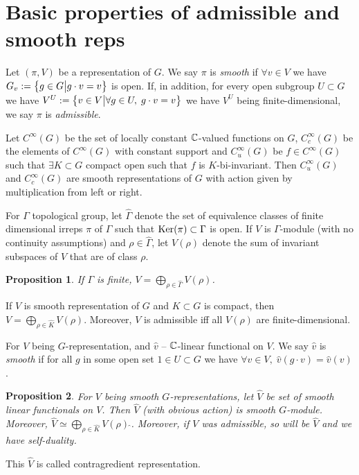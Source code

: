 \documentclass[pdf,notes]{beamer}
\theoremstyle{mystyle}
\newtheorem{prop}{Proposition}
\begin{document}
\section{Basic properties of admissible and smooth reps}
\begin{frame}
	\begin{definition}
		Let $(\pi,V)$ be a representation of $G$. We say $\pi$ is {\it smooth} if $\forall v\in V$ we have
		$G_v:=\left\{g\in G\big| g\cdot v=v\right\}$ is open. If, in addition, for every open subgroup $U\subset G$ we have $V^U:=
		\left\{v\in V\big| \forall g\in U,\;g\cdot v=v\right\}$ we have $V^U$ being finite-dimensional, we say
		$\pi$ is {\it admissible}.
	\end{definition}
	\begin{example}
		Let $C^\infty(G)$ be the set of locally constant $\mathbb{C}$-valued functions on $G$, $C^\infty_c(G)$ be the elements
		of $C^\infty(G)$ with constant support and $C^\infty_u(G)$ be $f\in C^\infty(G)$ such that $\exists K\subset G$
		compact open such that $f$ is $K$-bi-invariant. Then $C^\infty_u(G)$ and $C^\infty_c(G)$ are smooth representations
		of $G$ with action given by multiplication from left or right.
	\end{example}
\end{frame}
\begin{frame}
	For $\Gamma$ topological group, let $\hat{\Gamma}$ denote the set of equivalence classes of finite dimensional
	irreps $\pi$ of $\Gamma$
	such that $\operatorname{Ker}(\pi)\subset \Gamma$ is open. If $V$ is $\Gamma$-module (with no continuity assumptions) and
	$\rho\in\hat{\Gamma}$,
	let $V(\rho)$ denote the sum of invariant subspaces of $V$ that are of class $\rho$.
	\begin{prop}
		If $\Gamma$ is finite, $V=\bigoplus_{\rho\in\hat{\Gamma}}V(\rho)$.
		\label{<++>}
	\end{prop}
	\begin{theorem}
		If $V$ is smooth representation of $G$ and $K\subset G$ is compact,
		then $V=\bigoplus_{\rho\in\hat{K}}V(\rho)$. Moreover,
		$V$ is admissible iff all $V(\rho)$ are finite-dimensional.
		\label{}
	\end{theorem}
\end{frame}
\begin{frame}
	\begin{definition}
		For $V$ being $G$-representation, and $\hat{v}$ -- $\mathbb{C}$-linear functional on $V$. We say $\hat{v}$ is {\it smooth}
		if for all $g$ in some open set $1\in U\subset G$ we have $\forall v\in V,\;\hat{v}(g\cdot v)=\hat{v}(v)$.
	\end{definition}
	\begin{prop}
		For $V$ being smooth $G$-representations, let $\hat{V}$ be set of smooth linear functionals on $V$. Then
		$\hat{V}$ (with obvious action) is smooth $G$-module. Moreover, $\hat{V}\simeq\bigoplus_{\rho\in\hat{K}}V(\rho)
		\,{\hat{}}$. Moreover, if $V$ was admissible, so will be $\hat{V}$ and we have self-duality.
		\label{}
	\end{prop}
	This $\hat{V}$ is called contragredient representation.
\end{frame}
\end{document}
